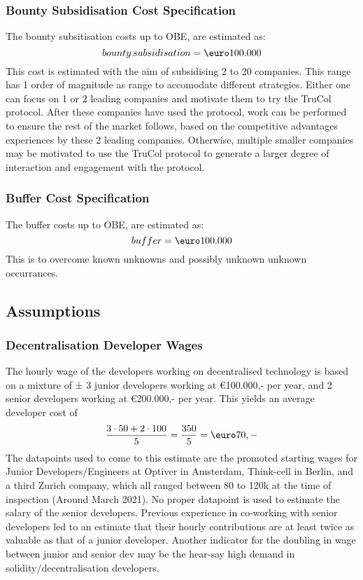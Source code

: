 \subsubsection{Bounty Subsidisation Cost Specification}\label{subsubsec:bounty_subsidisation_cost_specification}
The bounty subsitisation costs up to OBE, are estimated as:
\begin{equation}
	{bounty\, subsidisation}=\text{\euro}100.000
	\label{eq:bounty_subsidisation}
\end{equation}
This cost is estimated with the aim of subsidising 2 to 20 companies. This range has 1 order of magnitude as range to accomodate different strategies. Either one can focus on 1 or 2 leading companies and motivate them to try the TruCol protocol. After these companies have used the protocol, work can be performed to ensure the rest of the market follows, based on the competitive advantages experiences by these 2 leading companies. Otherwise, multiple smaller companies may be motivated to use the TruCol protocol to generate a larger degree of interaction and engagement with the protocol.

\subsubsection{Buffer Cost Specification}\label{subsubsec:buffer_cost_specification}
The buffer costs up to OBE, are estimated as:
\begin{equation}
	buffer=\text{\euro}100.000
	\label{eq:buffer_costs}
\end{equation}
This is to overcome known unknowns and possibly unknown unknown occurrances.

\subsection{Assumptions}\label{subsec:assumptions}
\subsubsection{Decentralisation Developer Wages}
The hourly wage of the developers working on decentralised technology is based on a mixture of ± 3 junior developers working at \euro 100.000,- per year, and 2 senior developers working at \euro 200.000,- per year. This yields an average developer cost of
\begin{equation}
	\frac{3\cdot 50+2\cdot 100}{5}=\frac{350}{5}=\textup{\euro}70,-
\end{equation}
The datapoints used to come to this estimate are the promoted starting wages for Junior Developers/Engineers at Optiver in Amsterdam, Think-cell in Berlin, and a third Zurich company, which all ranged between 80 to 120k at the time of inspection (Around March 2021). No proper datapoint is used to estimate the salary of the senior developers. Previous experience in co-working with senior developers led to an estimate that their hourly contributions are at least twice as valuable as that of a junior developer. Another indicator for the doubling in wage between junior and senior dev may be the hear-say high demand in solidity/decentralisation developers.

